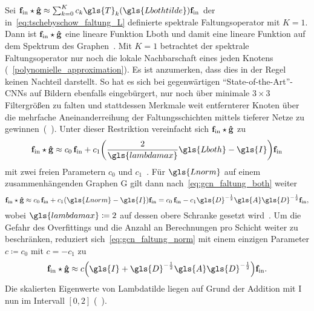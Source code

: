 Sei $\ve{f}_{\mathrm{in}} \star \ve{\hat g} \approx \sum_{k=0}^K c_k \gls{T}_k\left(\gls{Lbothtilde}\right) \ve{f}_{\mathrm{in}}$ der in~\eqref{eq:tschebyschow_faltung_L} definierte spektrale Faltungsoperator mit $K=1$.
Dann ist $\mathbf{f}_{\mathrm{in}} \star \mathbf{\hat g}$ eine lineare Funktion \bzgl{} \gls{Lboth} und damit eine lineare Funktion auf dem Spektrum des Graphen~\cite{gcn}.
Mit $K=1$ betrachtet der spektrale Faltungsoperator nur noch die lokale Nachbarschaft eines jeden Knotens (\vgl{}~\ref{polynomielle_approximation}).
Es ist anzumerken, dass dies in der Regel keinen Nachteil darstellt.
So hat es sich bei gegenwärtigen \enquote{State-of-the-Art}-\glspl{CNN} auf Bildern ebenfalls eingebürgert, nur noch über minimale $3\times3$ Filtergrößen zu falten und stattdessen Merkmale weit entfernterer Knoten über die mehrfache Aneinanderreihung der Faltungsschichten mittels tieferer Netze zu gewinnen~(\vgl{}~\cite{gcn, vgg, He}).
Unter dieser Restriktion vereinfacht sich $\mathbf{f}_{\mathrm{in}} \star \mathbf{\hat g}$ zu
\begin{equation}
  \ve{f}_{\mathrm{in}} \star \ve{\hat g} \approx c_0\, \ve{f}_{\mathrm{in}} + c_1 \left(\frac{2}{\gls{lambdamax}}\gls{Lboth} - \gls{I}\right)\ve{f}_{\mathrm{in}}
  \label{eq:gcn_faltung_both}
\end{equation}
mit zwei freien Parametern $c_0$ und $c_1$~\cite{gcn}.
Für $\gls{Lnorm}$ auf einem zusammenhängenden Graphen \gls{G} gilt dann nach~\eqref{eq:gcn_faltung_both} weiter
\begin{equation}
  \ve{f}_{\mathrm{in}} \star \ve{\hat g} \approx c_0 \, \ve{f}_{\mathrm{in}} + c_1 \left(\gls{Lnorm} - \gls{I}\right)\ve{f}_{\mathrm{in}} = c_0 \, \ve{f}_{\mathrm{in}} - c_1 \gls{D}^{-\frac{1}{2}} \gls{A} \gls{D}^{-\frac{1}{2}} \ve{f}_{\mathrm{in}},
  \label{eq:gcn_faltung_norm}
\end{equation}
wobei $\gls{lambdamax} \coloneqq 2$ auf dessen obere Schranke gesetzt wird~\cite{gcn}.
Um die Gefahr des Overfittings und die Anzahl an Berechnungen pro Schicht weiter zu beschränken, reduziert sich~\eqref{eq:gcn_faltung_norm} mit einem einzigen Parameter $c \coloneqq c_0$ mit $c = -c_1$ zu~\cite{gcn}
\begin{equation*}
  \ve{f}_{\mathrm{in}} \star \ve{\hat g} \approx c \left(\gls{I} + \gls{D}^{-\frac{1}{2}} \gls{A} \gls{D}^{-\frac{1}{2}} \right) \ve{f}_{\mathrm{in}}.
\end{equation*}
Die skalierten Eigenwerte von \gls{Lambdatilde} liegen auf Grund der Addition mit \gls{I} nun im Intervall $\left[0, 2\right]$ (\vgl{}~\cite{gcn}).
